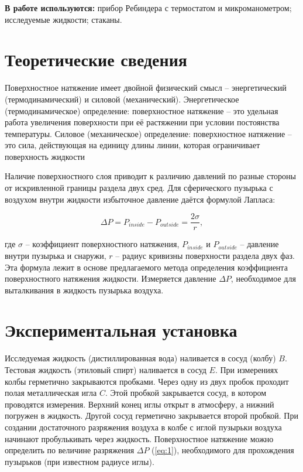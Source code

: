 \documentclass[a4paper,11.5pt]{article} %
\begin{document}
\textbf{В работе используются:} прибор Ребиндера с термостатом и микроманометром; исследуемые жидкости; стаканы.

\section{Теоретические сведения}

Поверхностное натяжение имеет двойной физический смысл -- энергетический (термодинамический) и силовой (механический). Энергетическое (термодинамическое) определение: поверхностное натяжение -- это удельная работа увеличения поверхности при её растяжении при условии постоянства температуры. Силовое (механическое) определение: поверхностное натяжение -- это сила, действующая на единицу длины линии, которая ограничивает поверхность жидкости

Наличие поверхностного слоя приводит к различию давлений по разные стороны от искривленной границы раздела двух сред. Для сферического пузырька с воздухом внутри жидкости избыточное давление даётся формулой Лапласа:

\begin{equation}
\Delta P = P_{inside} - P_{outside} = \frac{2\sigma}{r},
\label{eq:1}
\end{equation}

где $\sigma$ – коэффициент поверхностного натяжения, $P_{inside}$ и $P_{outside}$ – давление внутри пузырька и снаружи, $r$ – радиус кривизны поверхности раздела двух фаз. Эта формула лежит в основе предлагаемого метода определения коэффициента поверхностного натяжения жидкости. Измеряется давление $\Delta P$, необходимое для выталкивания в жидкость пузырька воздуха.

\section{Экспериментальная установка}

Исследуемая жидкость (дистиллированная вода) наливается в сосуд (колбу) $B$. Тестовая жидкость (этиловый спирт) наливается в сосуд $E$. При измерениях колбы герметично закрываются пробками. Через одну из двух пробок проходит полая металлическая игла $C$. Этой пробкой закрывается сосуд, в котором проводятся измерения. Верхний конец иглы открыт в атмосферу, а нижний погружен в жидкость. Другой сосуд герметично закрывается второй пробкой. При создании достаточного разряжения воздуха в колбе с иглой пузырьки воздуха начинают пробулькивать через жидкость. Поверхностное натяжение можно определить по величине разряжения $\Delta P$ (\ref{eq:1}), необходимого для прохождения пузырьков (при известном радиусе иглы).
\end{document}
